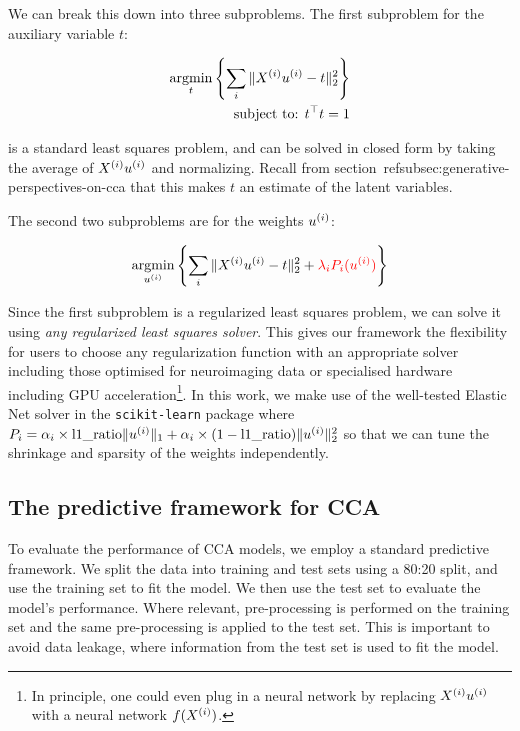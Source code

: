 We can break this down into three subproblems.
The first subproblem for the auxiliary variable \(t\):

\begin{align}
    \underset{t}{\mathrm{argmin}}\left\{\sum_i \|X^{(i)} u^{(i)} - t\|_2^2\right\}\\
    \text{subject to: }t^\top t = 1\\
\end{align}

is a standard least squares problem, and can be solved in closed form by taking the average of $X^{(i)} u^{(i)}$ and normalizing.
Recall from section~ref{subsec:generative-perspectives-on-cca} that this makes $t$ an estimate of the latent variables.

The second two subproblems are for the weights \(u^{(i)}\):

\begin{align}
    \underset{u^{(i)}}{\mathrm{argmin}}\left\{\sum_i \|X^{(i)} u^{(i)} - t\|_2^2 + \textcolor{red}{\lambda_i P_i(u^{(i)})} \right\}\\
\end{align}

Since the first subproblem is a regularized least squares problem, we can solve it using \textit{any regularized least squares solver}.
This gives our framework the flexibility for users to choose any regularization function with an appropriate solver including those optimised for neuroimaging data\citep{Nilearn_contributors_Nilearn} or specialised hardware including GPU acceleration\footnote{In principle, one could even plug in a neural network by replacing $X^{(i)} u^{(i)}$ with a neural network $f(X^{(i)})$.}.
In this work, we make use of the well-tested Elastic Net solver in the \texttt{scikit-learn} package \citep{pedregosa2011scikit} where $P_i=\alpha_i \times \text{l1\_ratio} \|u^{(i)}\|_1 + \alpha_i \times (1-\text{l1\_ratio}) \|u^{(i)}\|^2_2$ so that we can tune the shrinkage and sparsity of the weights independently.

\subsection{The predictive framework for CCA}

To evaluate the performance of CCA models, we employ a standard predictive framework.
We split the data into training and test sets using a 80:20 split, and use the training set to fit the model.
We then use the test set to evaluate the model's performance.
Where relevant, pre-processing is performed on the training set and the same pre-processing is applied to the test set.
This is important to avoid data leakage, where information from the test set is used to fit the model.

